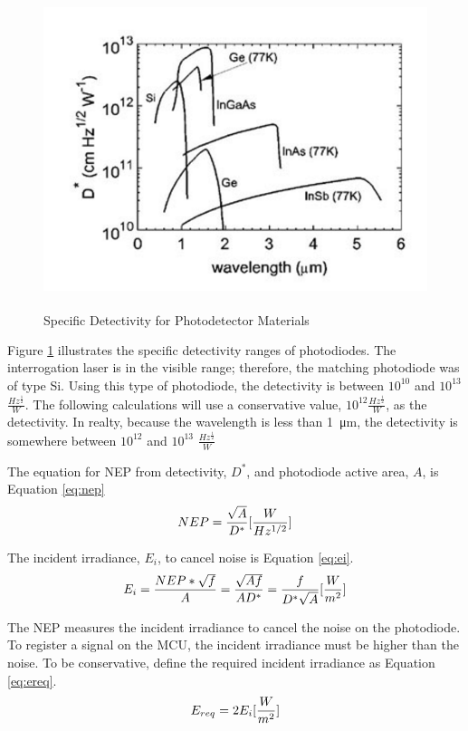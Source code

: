 \documentclass[letterpaper,10pt]{article}
\begin{document}
\begin{spacing}{1.15}
\begin{figure} [H]
	\centering
	\includegraphics[scale=0.4]{detectivity-table.png}
	\label{fig:detectivity-table}
	\caption{Specific Detectivity for Photodetector Materials \textsuperscript{\cite{Optical}} \label{fig:detectivity-table}}
\end{figure}

Figure \ref{fig:detectivity-table} illustrates the specific detectivity ranges of photodiodes. The interrogation laser is in the visible range; therefore, the matching photodiode was of type Si. Using this type of photodiode, the detectivity is between $10^{10}$ and $10^{13}$ $\frac{Hz^{\frac{1}{2}}}{W}$. The following calculations will use a conservative value, $10^{12} \frac{Hz^{\frac{1}{2}}}{W}$, as the detectivity. In realty, because the wavelength is less than \SI{1}{\micro\meter}, the detectivity is somewhere between $10^{12}$ and $10^{13}$ $\frac{Hz^{\frac{1}{2}}}{W}$

The equation for NEP from detectivity, $D^*$, and photodiode active area, $A$,  is Equation \ref{eq:nep}
\begin{equation} \large  \label{eq:nep}
	NEP = \frac{\sqrt{A}}{D^*}  [\frac{W}{Hz^{1/2}}]
\end{equation}

The incident irradiance, $E_i$, to cancel noise is Equation \ref{eq:ei}.
\begin{equation} \large  \label{eq:ei}
	E_i = \frac{NEP * \sqrt{f}}{A} = \frac{\sqrt{Af}}{AD^*} = \frac{f}{D^*\sqrt{A}} [\frac{W}{m^{2}}]
\end{equation}

The NEP measures the incident irradiance to cancel the noise on the photodiode. To register a signal on the MCU, the incident irradiance must be higher than the noise. To be conservative, define the required incident irradiance as Equation \ref{eq:ereq}.
\begin{equation} \large \label{eq:ereq}
	E_{req} = 2E_i [\frac{W}{m^{2}}]
\end{equation}


\end{spacing}
\end{document}
